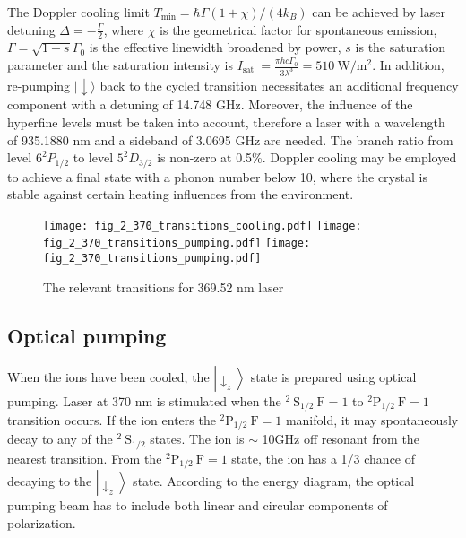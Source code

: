 The Doppler cooling limit $T_{\min }=\hbar \Gamma(1+\chi) /\left(4 k_B\right)$ can be achieved by laser detuning $\Delta=-\frac{\Gamma}{2}$, where $\chi$ is the geometrical factor for spontaneous emission, $\Gamma=\sqrt{1+s} \Gamma_0$ is the effective linewidth broadened by power, $s$ is the saturation parameter and the saturation intensity is $I_{\text {sat }}=\frac{\pi h c \Gamma_0}{3 \lambda^3}=510 \mathrm{~W} / \mathrm{m}^2$. In addition, re-pumping $|\downarrow\rangle$ back to the cycled transition necessitates an additional frequency component with a detuning of 14.748 GHz. Moreover, the influence of the hyperfine levels must be taken into account, therefore a laser with a wavelength of 935.1880 nm and a sideband of 3.0695 GHz are needed. The branch ratio from level $6^2 P_{1 / 2}$ to level $5^2 D_{3 / 2}$ is non-zero at 0.5\%. Doppler cooling may be employed to achieve a final state with a phonon number below 10, where the crystal is stable against certain heating influences from the environment.

\begin{figure}
    \centering
    {\texttt{[image: fig\_2\_370\_transitions\_cooling.pdf]}}
    {\texttt{[image: fig\_2\_370\_transitions\_pumping.pdf]}}
    {\texttt{[image: fig\_2\_370\_transitions\_pumping.pdf]}}
    \caption{The relevant transitions for 369.52 nm laser}
    \label{fig:370_transitions}
\end{figure}

\subsection{Optical pumping}

When the ions have been cooled, the $\left|\downarrow_z\right\rangle$ state is prepared using optical pumping. Laser at 370 nm is stimulated when the ${ }^2 \mathrm{~S}_{1 / 2} \mathrm{~F}=1$ to ${ }^2 \mathrm{P}_{1 / 2} \mathrm{~F}=1$ transition occurs. If the ion enters the ${ }^2 \mathrm{P}_{1 / 2} \mathrm{~F}=1$ manifold, it may spontaneously decay to any of the ${ }^2 \mathrm{~S}_{1 / 2}$ states. The ion is $\sim$ 10GHz off resonant from the nearest transition. From the ${ }^2 \mathrm{P}_{1 / 2} \mathrm{~F}=1$ state, the ion has a 1/3 chance of decaying to the $\left|\downarrow_z\right\rangle$ state. According to the energy diagram, the optical pumping beam has to include both linear and circular components of polarization.

